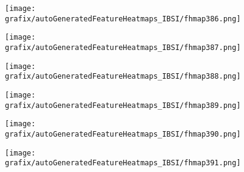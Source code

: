 \hspace{\hsp} 
\begin{subfigure}{\wid\textwidth} 
    \centering 
    \caption{\tiny \sffamily {}} 
    \vspace{\vsp} 
    \texttt{[image: grafix/autoGeneratedFeatureHeatmaps\_IBSI/fhmap386.png]} 
\end{subfigure} 
\hspace{\hsp} 
\begin{subfigure}{\wid\textwidth} 
    \centering 
    \caption{\tiny \sffamily {}} 
    \vspace{\vsp} 
    \texttt{[image: grafix/autoGeneratedFeatureHeatmaps\_IBSI/fhmap387.png]} 
\end{subfigure} 
\hspace{\hsp} 
\begin{subfigure}{\wid\textwidth} 
    \centering 
    \caption{\tiny \sffamily {}} 
    \vspace{\vsp} 
    \texttt{[image: grafix/autoGeneratedFeatureHeatmaps\_IBSI/fhmap388.png]} 
\end{subfigure} 
\hspace{\hsp} 
\begin{subfigure}{\wid\textwidth} 
    \centering 
    \caption{\tiny \sffamily {}} 
    \vspace{\vsp} 
    \texttt{[image: grafix/autoGeneratedFeatureHeatmaps\_IBSI/fhmap389.png]} 
\end{subfigure} 
\hspace{\hsp} 
\begin{subfigure}{\wid\textwidth} 
    \centering 
    \caption{\tiny \sffamily {}} 
    \vspace{\vsp} 
    \texttt{[image: grafix/autoGeneratedFeatureHeatmaps\_IBSI/fhmap390.png]} 
\end{subfigure} 
\hspace{\hsp} 
\begin{subfigure}{\wid\textwidth} 
    \centering 
    \caption{\tiny \sffamily {}} 
    \vspace{\vsp} 
    \texttt{[image: grafix/autoGeneratedFeatureHeatmaps\_IBSI/fhmap391.png]} 
\end{subfigure} 
\hspace{\hsp} 
